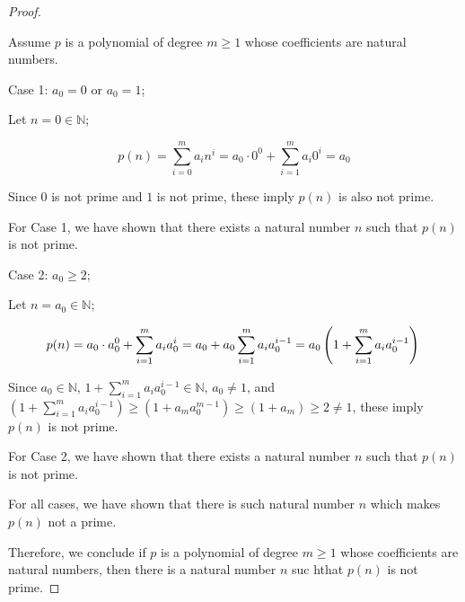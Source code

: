 \documentclass[11pt]{article}
\newcommand{\nats}{\mathbb{N}}
\begin{document}
\begin{enumerate}
\begin{proof}
    \begin{adjustwidth}{1cm}{}
    \end{adjustwidth}

    \begin{adjustwidth}{0.5cm}{}
        Assume $p$ is a polynomial of degree $m\geq 1$ whose coefficients are natural numbers.

        \begin{adjustwidth}{1cm}{}
            Case 1: $a_0 = 0$ or $a_0 = 1$;
            \begin{adjustwidth}{1.25cm}{}
                Let $n = 0\in\nats$;

                \begin{adjustwidth}{1.5cm}{}
                    \[p(n)=\sum_{i=0}^{m}a_i n^i=a_0\cdot 0^0+\sum_{i=1}^{m}a_i 0^i=a_0\]
                \end{adjustwidth}
                Since $0$ is not prime and $1$ is not prime, these imply $p(n)$ is also not prime.
            \end{adjustwidth}
            For Case 1, we have shown that there exists a natural number $n$ such that $p(n)$ is not prime.

            Case 2: $a_0 \geq 2$;
            \begin{adjustwidth}{1.25cm}{}
                Let $n = a_0\in \nats$;

                \begin{adjustwidth}{1.5cm}{}
                    \[
                        p(n)=a_0\cdot a_0^0 + \sum_{i=1}^m a_i a_0^i=a_0 + a_0\sum_{i=1}^m a_i a_0^{i-1} = a_0\left(1+\sum_{i=1}^m a_i a_0^{i-1}\right)\\
                    \]

                \end{adjustwidth}
                    Since $a_0\in\nats$, $1+\displaystyle\sum_{i=1}^m a_i a_0^{i-1}\in \nats$, $a_0\neq 1$, and $\left(1+\displaystyle\sum_{i=1}^m a_i a_0^{i-1}\right) \geq (1+ a_m a_0^{m-1}) \geq (1+a_m)\geq 2 \neq 1$, these imply $p(n)$ is not prime.
            \end{adjustwidth}
            For Case 2, we have shown that there exists a natural number $n$ such that $p(n)$ is not prime.
        \end{adjustwidth}
        For all cases, we have shown that there is such natural number $n$ which makes $p(n)$ not a prime.
    \end{adjustwidth}
    Therefore, we conclude if $p$ is a polynomial of degree $m\geq1$ whose coefficients are natural numbers, then there is a natural number $n$ suc hthat $p(n)$ is not prime.
\end{proof}

\end{enumerate}
\end{document}
